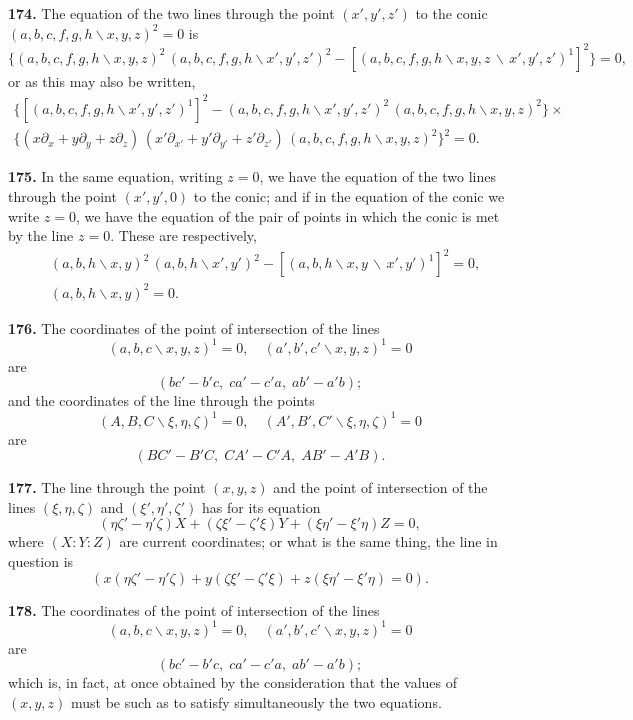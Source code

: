 \documentclass[11pt,a4paper]{book}
\begin{document}
\begin{center}
\textbf{174.} The equation of the two lines through the point $(x',y',z')$ to the conic
$(a,b,c,f,g,h\!\backslash x,y,z)^2=0$ is
\[
\{(a,b,c,f,g,h\!\backslash x,y,z)^2\,(a,b,c,f,g,h\!\backslash x',y',z')^2 - [(a,b,c,f,g,h\!\backslash x,y,z\,\backslash\,x',y',z')^1]^2\}=0,
\]
or as this may also be written,
\begin{multline*}
\{[(a,b,c,f,g,h\!\backslash x',y',z')^1]^2 - (a,b,c,f,g,h\!\backslash x',y',z')^2\,(a,b,c,f,g,h\!\backslash x,y,z)^2\}\times\\
\{(x\partial_x+y\partial_y+z\partial_z)\,(x'\partial_{x'}+y'\partial_{y'}+z'\partial_{z'})\,(a,b,c,f,g,h\!\backslash x,y,z)^2\}^2 = 0.
\end{multline*}

\textbf{175.} In the same equation, writing $z=0$, we have the equation of the two
lines through the point $(x',y',0)$ to the conic; and if in the equation of the conic
we write $z=0$, we have the equation of the pair of points in which the conic is
met by the line $z=0$. These are respectively,
\begin{align*}
&(a,b,h\!\backslash x,y)^2\,(a,b,h\!\backslash x',y')^2 - [(a,b,h\!\backslash x,y\,\backslash\,x',y')^1]^2 = 0,\\
&(a,b,h\!\backslash x,y)^2 = 0.
\end{align*}

\textbf{176.} The coordinates of the point of intersection of the lines
\[
(a,b,c\!\backslash x,y,z)^1=0,\quad (a',b',c'\!\backslash x,y,z)^1=0
\]
are
\[
(bc'-b'c,\; ca'-c'a,\; ab'-a'b);
\]
and the coordinates of the line through the points
\[
(A,B,C\!\backslash \xi,\eta,\zeta)^1=0,\quad (A',B',C'\!\backslash \xi,\eta,\zeta)^1=0
\]
are
\[
(BC'-B'C,\; CA'-C'A,\; AB'-A'B).
\]

\textbf{177.} The line through the point $(x,y,z)$ and the point of intersection of the
lines $(\xi,\eta,\zeta)$ and $(\xi',\eta',\zeta')$ has for its equation
\[
(\eta\zeta'-\eta'\zeta)X + (\zeta\xi'-\zeta'\xi)Y + (\xi\eta'-\xi'\eta)Z = 0,
\]
where $(X:Y:Z)$ are current coordinates; or what is the same thing, the line in
question is
\[
(x(\eta\zeta'-\eta'\zeta) + y(\zeta\xi'-\zeta'\xi) + z(\xi\eta'-\xi'\eta) = 0).
\]

\textbf{178.} The coordinates of the point of intersection of the lines
\[
(a,b,c\!\backslash x,y,z)^1=0,\quad (a',b',c'\!\backslash x,y,z)^1=0
\]
are
\[
(bc'-b'c,\; ca'-c'a,\; ab'-a'b);
\]
which is, in fact, at once obtained by the consideration that the values of $(x,y,z)$
must be such as to satisfy simultaneously the two equations.


\end{center}
\end{document}
